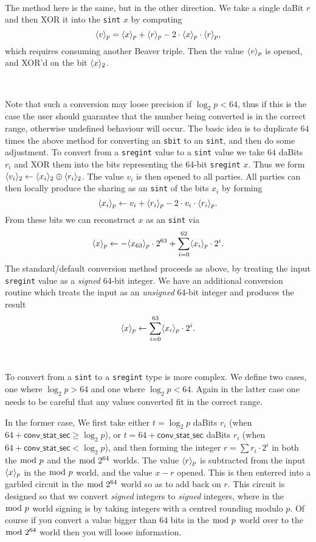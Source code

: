 ~

The method here is the same, but in the other direction.
We take a single daBit $r$ and then XOR it into the \verb|sint| $x$
by computing
\[  \langle v \rangle_p = \langle x \rangle_p + \langle r \rangle_p - 2 \cdot \langle x \rangle_p \cdot \langle r \rangle_p, \]
which requires consuming another Beaver triple.
Then the value $\langle v \rangle_p$ is opened, and XOR'd on
the bit $\langle x \rangle_2$.

~

Note that such a conversion may loose precision if
$\log_2 p < 64$, thus if this is the case the user should guarantee
that the number being converted is in the correct range, otherwise
undefined behaviour will occur.
The basic idea is to duplicate $64$ times the above method for converting
an \verb|sbit| to an \verb|sint|, and then do some adjustment.
To convert from a \verb|sregint| value to a \verb|sint| value we take
$64$ daBits $r_i$ and XOR them into the bits representing the 64-bit
\verb|sregint| $x$.
Thus we form $\langle v_i \rangle_2 \leftarrow \langle x_i \rangle_2 \oplus \langle r_i \rangle_2$.
The value $v_i$ is then opened to all parties.
All parties can then locally produce the sharing as an \verb|sint|
of the bits $x_i$ by forming
\[  \langle x_i \rangle_p \leftarrow v_i + \langle r_i \rangle_p - 2 \cdot v_i \cdot \langle r_i \rangle_p. \]
From these bits we can reconstruct $x$ as an \verb|sint| via
\[ \langle x \rangle_p \leftarrow - \langle x_{63} \rangle_p \cdot 2^{63} + \sum_{i=0}^{62} \langle x_i \rangle_p \cdot 2^i. \]
The standard/default conversion method proceeds as above, by treating
the input \verb|sregint| value as a {\em signed} 64-bit integer.
We have an additional conversion routine which treats the input as an
  {\em unsigned} 64-bit integer and produces the result
\[ \langle x \rangle_p \leftarrow \sum_{i=0}^{63} \langle x_i \rangle_p \cdot 2^i. \]


~

To convert from a \verb|sint| to a \verb|sregint| type is more complex.
We define two cases, one where $\log_2 p > 64$ and one where $\log_2 p < 64$.
Again in the latter case one needs to be careful that any values converted
fit in the correct range.

In the former case, We first take either $t=\log_2 p$ daBits $r_i$
(when $64+\mathsf{conv\_stat\_sec} \ge \log_2 p$),
or $t=64+\mathsf{conv\_stat\_sec}$ daBits $r_i$
(when $64+\mathsf{conv\_stat\_sec}<\log_2 p$),
and then forming the integer $r = \sum r_i \cdot 2^i$
in both the $\bmod \; p$ and the $\bmod \; 2^{64}$ worlds.
The value $\langle r \rangle_p$ is subtracted from the input $\langle x \rangle_p$ in
the $\bmod \; p$ world, and the value $x-r$ opened.
This is then enterred into a garbled circuit in the $\bmod \; 2^{64}$ world so as to add back on $r$.
This circuit is designed so that we convert {\it signed}  integers to {\it signed}
integers, where in the $\bmod \; p$ world signing is by taking integers with a centred
rounding modulo $p$.
Of course if you convert a value bigger than $64$ bits in the $\bmod \; p$ world over to the $\bmod \; 2^{64}$
world then you will loose information.

